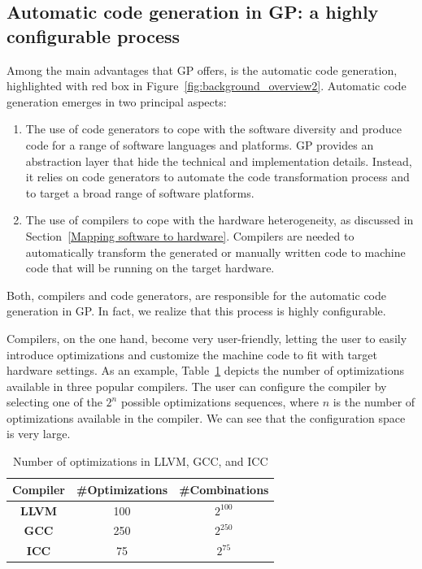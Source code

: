 \subsection{Automatic code generation in GP: a highly configurable process}
Among the main advantages that GP offers, is the automatic code generation, highlighted with red box in Figure~\ref{fig:background_overview2}. Automatic code generation emerges in two principal aspects: 
\begin{enumerate}
	\item The use of code generators to cope with the software diversity and produce code for a range of software languages and platforms. GP provides an abstraction layer that hide the technical and implementation details. Instead, it relies on code generators to automate the code transformation process and to target a broad range of software platforms.
	\item The use of compilers to cope with the hardware heterogeneity, as discussed in Section~\ref{Mapping software to hardware}. Compilers are needed to automatically transform the generated or manually written code to machine code that will be running on the target hardware.
\end{enumerate}

Both, compilers and code generators, are responsible for the automatic code generation in GP. 
In fact, we realize that this process is highly configurable. 

Compilers, on the one hand, become very user-friendly, letting the user to easily introduce optimizations and customize the machine code to fit with target hardware settings.
As an example, Table~\ref{iccgccllvm} depicts the number of optimizations available in three popular compilers. The user can configure the compiler by selecting one of the $2^{n}$ possible optimizations sequences, where $n$ is the number of optimizations available in the compiler. We can see that the configuration space is very large. 

\begin{table}[h]
	\centering
	\caption{Number of optimizations in LLVM, GCC, and ICC}
	\label{my-label}
	\begin{tabular}{|c|c|c|}
		\hline
		\textbf{Compiler} & \textbf{\#Optimizations} & \textbf{\#Combinations} \\ \hline
		\textbf{LLVM}     & 100    & $2^{100}$                                 \\ \hline
		\textbf{GCC}      & 250    & $2^{250}$                                 \\ \hline
		\textbf{ICC}      & 75     & $2^{75}$                                 \\ \hline
	\end{tabular}
	\label{iccgccllvm}
\end{table}

